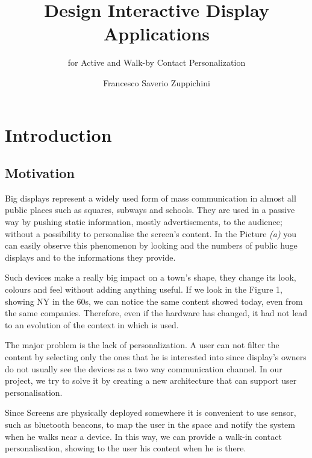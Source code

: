 \documentclass[]{usiinfbachelorproject}
\author{Francesco Saverio Zuppichini}
\title{Design Interactive Display Applications}
\subtitle{for Active and Walk-by Contact Personalization}
\begin{document}
\maketitle

\section{Introduction}
\subsection{Motivation}

Big displays represent a widely used form of mass communication in almost all public places such as squares, subways and schools. They are used in a passive way by pushing static information, mostly advertisements, to the audience; without a possibility to personalise the screen's content. In the Picture \emph{(a)} you can easily observe this phenomenon by looking and the numbers of public huge displays and to the informations they provide.

Such devices make a really big impact on a town's shape, they change its look, colours and feel without adding anything useful. If we look in the Figure 1, showing NY in the 60s, we can notice the same content showed today, even from the same companies. Therefore, even if the hardware has changed, it had not lead to an evolution of the context in which is used. 

The major problem is the lack of personalization. A user can not filter the content by selecting only the ones that he is interested into since display's owners do not usually see the devices as a two way communication channel. In our project, we try to solve it by creating a new architecture that can support user personalisation.

Since Screens are physically deployed somewhere it is convenient to use sensor, such as bluetooth beacons, to map the user in the space and notify the system when he walks near a device. In this way, we can provide a walk-in 
contact personalisation, showing to the user his content when he is there.
\end{document}
